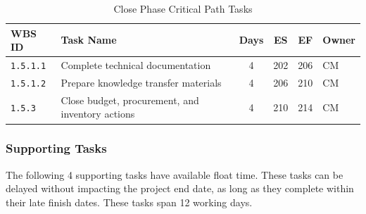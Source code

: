 \begin{table}[H]
\centering
\small
{}
\begin{tabular}{|l|p{5cm}|c|c|c|l|}
\hline
\rowcolor{closepink!40}
\textbf{WBS ID} & \textbf{Task Name} & \textbf{Days} & \textbf{ES} & \textbf{EF} & \textbf{Owner} \\
\hline
\texttt{1.5.1.1} & Complete technical documentation & 4 & 202 & 206 & CM \\
\hline
\texttt{1.5.1.2} & Prepare knowledge transfer materials & 4 & 206 & 210 & CM \\
\hline
\texttt{1.5.3} & Close budget, procurement, and inventory actions & 4 & 210 & 214 & CM \\
\hline
\end{tabular}
\caption{Close Phase Critical Path Tasks}
\label{tab:nld_close_critical}
\end{table}

\subsubsection{Supporting Tasks}

\noindent The following 4 supporting tasks have available float time. 
These tasks can be delayed without impacting the project end date, as long as they complete within their late finish dates. 
These tasks span 12 working days.

\vspace{0.5em}

